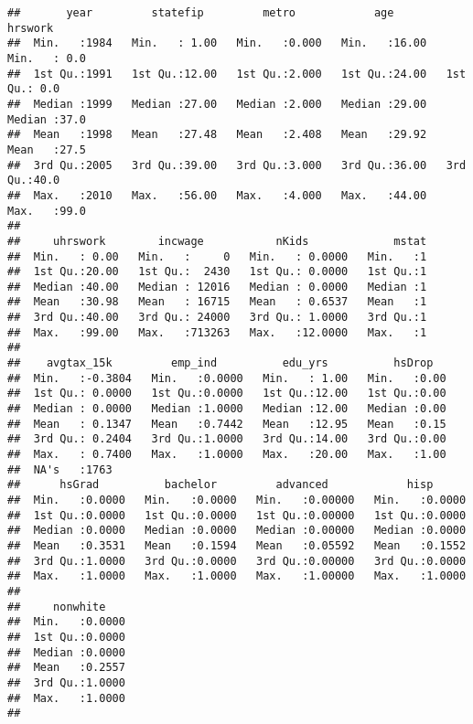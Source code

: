 \documentclass[
]{article}
\begin{document}
\begin{verbatim}
##       year         statefip         metro            age           hrswork    
##  Min.   :1984   Min.   : 1.00   Min.   :0.000   Min.   :16.00   Min.   : 0.0  
##  1st Qu.:1991   1st Qu.:12.00   1st Qu.:2.000   1st Qu.:24.00   1st Qu.: 0.0  
##  Median :1999   Median :27.00   Median :2.000   Median :29.00   Median :37.0  
##  Mean   :1998   Mean   :27.48   Mean   :2.408   Mean   :29.92   Mean   :27.5  
##  3rd Qu.:2005   3rd Qu.:39.00   3rd Qu.:3.000   3rd Qu.:36.00   3rd Qu.:40.0  
##  Max.   :2010   Max.   :56.00   Max.   :4.000   Max.   :44.00   Max.   :99.0  
##                                                                               
##     uhrswork        incwage           nKids             mstat  
##  Min.   : 0.00   Min.   :     0   Min.   : 0.0000   Min.   :1  
##  1st Qu.:20.00   1st Qu.:  2430   1st Qu.: 0.0000   1st Qu.:1  
##  Median :40.00   Median : 12016   Median : 0.0000   Median :1  
##  Mean   :30.98   Mean   : 16715   Mean   : 0.6537   Mean   :1  
##  3rd Qu.:40.00   3rd Qu.: 24000   3rd Qu.: 1.0000   3rd Qu.:1  
##  Max.   :99.00   Max.   :713263   Max.   :12.0000   Max.   :1  
##                                                                
##    avgtax_15k         emp_ind          edu_yrs          hsDrop    
##  Min.   :-0.3804   Min.   :0.0000   Min.   : 1.00   Min.   :0.00  
##  1st Qu.: 0.0000   1st Qu.:0.0000   1st Qu.:12.00   1st Qu.:0.00  
##  Median : 0.0000   Median :1.0000   Median :12.00   Median :0.00  
##  Mean   : 0.1347   Mean   :0.7442   Mean   :12.95   Mean   :0.15  
##  3rd Qu.: 0.2404   3rd Qu.:1.0000   3rd Qu.:14.00   3rd Qu.:0.00  
##  Max.   : 0.7400   Max.   :1.0000   Max.   :20.00   Max.   :1.00  
##  NA's   :1763                                                     
##      hsGrad          bachelor         advanced            hisp       
##  Min.   :0.0000   Min.   :0.0000   Min.   :0.00000   Min.   :0.0000  
##  1st Qu.:0.0000   1st Qu.:0.0000   1st Qu.:0.00000   1st Qu.:0.0000  
##  Median :0.0000   Median :0.0000   Median :0.00000   Median :0.0000  
##  Mean   :0.3531   Mean   :0.1594   Mean   :0.05592   Mean   :0.1552  
##  3rd Qu.:1.0000   3rd Qu.:0.0000   3rd Qu.:0.00000   3rd Qu.:0.0000  
##  Max.   :1.0000   Max.   :1.0000   Max.   :1.00000   Max.   :1.0000  
##                                                                      
##     nonwhite     
##  Min.   :0.0000  
##  1st Qu.:0.0000  
##  Median :0.0000  
##  Mean   :0.2557  
##  3rd Qu.:1.0000  
##  Max.   :1.0000  
## 
\end{verbatim}
\end{document}
